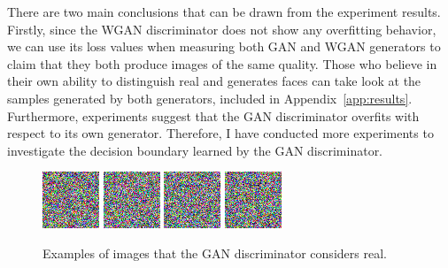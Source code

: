 There are two main conclusions that can be drawn from the experiment results. Firstly, since the WGAN discriminator does not show any overfitting behavior, we can use its loss values when measuring both GAN and WGAN generators to claim that they both produce images of the same quality. Those who believe in their own ability to distinguish real and generates faces can take look at the samples generated by both generators, included in Appendix~\ref{app:results}. Furthermore, experiments suggest that the GAN discriminator overfits with respect to its own generator. Therefore, I have conducted more experiments to investigate the decision boundary learned by the GAN discriminator.

\begin{figure}[h]
	\centering
	\includegraphics[scale=1]{figures/gan_found_image1}
	\includegraphics[scale=1]{figures/gan_found_image2}
	\includegraphics[scale=1]{figures/gan_found_image3}
	\includegraphics[scale=1]{figures/gan_found_image4}
	\caption{Examples of images that the GAN discriminator considers real.}
	\label{fig:gan_found_images}
\end{figure}

